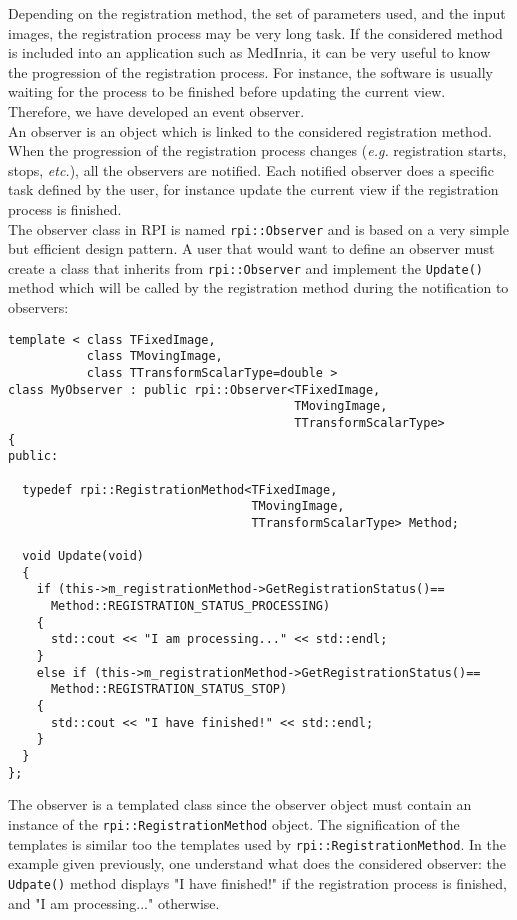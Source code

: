 Depending on the registration method, the set of parameters used, and the input images, the registration process may be very long task. If the considered method is included into an application such as MedInria, it can be very useful to know the progression of the registration process. For instance, the software is usually waiting for the process to be finished before updating the current view. Therefore, we have developed an event observer.
\\
An observer is an object which is linked to the considered registration method. When the progression of the registration process changes (\textit{e.g.} registration starts, stops, \textit{etc.}), all the observers are notified. Each notified observer does a specific task defined by the user, for instance update the current view if the registration process is finished.
\\
The observer class in RPI is named \texttt{rpi::Observer} and is based on a very simple but efficient design pattern. A user that would want to define an observer must create a class that inherits from \texttt{rpi::Observer} and implement the \texttt{Update()} method which will be called by the registration method during the notification to observers:
%
\begin{lstlisting}
template < class TFixedImage,
           class TMovingImage,
           class TTransformScalarType=double >
class MyObserver : public rpi::Observer<TFixedImage,
                                        TMovingImage,
                                        TTransformScalarType>
{
public:

  typedef rpi::RegistrationMethod<TFixedImage,
                                  TMovingImage,
                                  TTransformScalarType> Method;

  void Update(void)
  {
    if (this->m_registrationMethod->GetRegistrationStatus()==
      Method::REGISTRATION_STATUS_PROCESSING)
    {
      std::cout << "I am processing..." << std::endl;
    }
    else if (this->m_registrationMethod->GetRegistrationStatus()==
      Method::REGISTRATION_STATUS_STOP)
    {
      std::cout << "I have finished!" << std::endl;
    }
  }
};
\end{lstlisting}
%
The observer is a templated class since the observer object must contain an instance of the \texttt{rpi::RegistrationMethod} object. The signification of the templates is similar too the templates used by \texttt{rpi::RegistrationMethod}. In the example given previously, one understand what does the considered observer: the \texttt{Udpate()} method displays "I have finished!" if the registration process is finished, and "I am processing..." otherwise.
